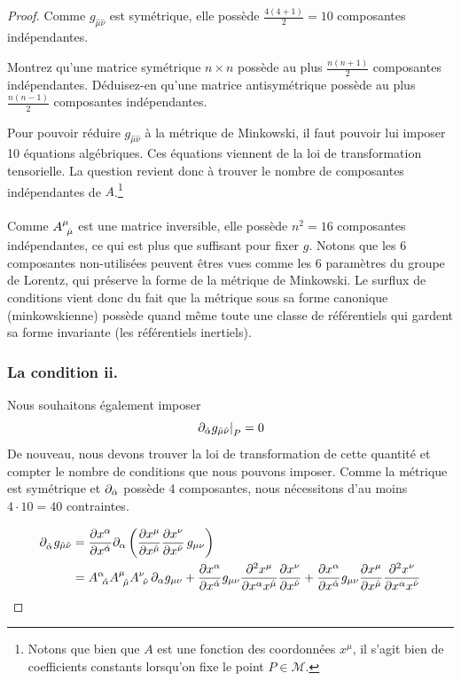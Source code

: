 \begin{proof}
Comme $g_{\hat{\mu}\hat{\nu}}$ est symétrique, elle possède $\frac{4 (4+1)}{2} = 10$ composantes indépendantes.
\begin{exerc}
    Montrez qu'une matrice symétrique $n \times n$ possède au plus $\frac{n(n+1)}{2}$ composantes indépendantes. Déduisez-en qu'une matrice antisymétrique possède au plus $\frac{n(n-1)}{2}$ composantes indépendantes.
\end{exerc}
Pour pouvoir réduire $g_{\hat{\mu}\hat{\nu}}$ à la métrique de Minkowski, il faut pouvoir lui imposer 10 équations algébriques. Ces équations viennent de la loi de transformation tensorielle. La question revient donc à trouver le nombre de composantes indépendantes de $A$.\footnote{Notons que bien que $A$ est une fonction des coordonnées $x^\mu$, il s'agit bien de coefficients constants lorsqu'on fixe le point $P\in \mathcal{M}$.}\\
\\
Comme $A\indices{^{\mu}_{\!\hat{\mu}}}$ est une matrice inversible, elle possède $n^2 = 16$ composantes indépendantes, ce qui est plus que suffisant pour fixer $g$. Notons que les 6 composantes non-utilisées peuvent êtres vues comme les 6 paramètres du groupe de Lorentz, qui préserve la forme de la métrique de Minkowski. Le surflux de conditions vient donc du fait que la métrique sous sa forme canonique (minkowskienne) possède quand même toute une classe de référentiels qui gardent sa forme invariante (les référentiels inertiels).
\subsubsection{La condition ii.}

Nous souhaitons également imposer
\begin{equation}
    \left. \partial_{\hat{\alpha}}g_{\hat{\mu}\hat{\nu}} \right|_P =0
\end{equation}
De nouveau, nous devons trouver la loi de transformation de cette quantité et compter le nombre de conditions que nous pouvons imposer. Comme la métrique est symétrique et $\partial_{\hat{\alpha}}$ possède 4 composantes, nous nécessitons d'au moins $4\cdot 10 = 40$ contraintes.

\begin{align}
\nonumber
   \partial\indices{_{\hat{\alpha}}}g_{\hat{\mu}\hat{\nu}} &= \frac{\partial x^{\alpha}}{\partial x^{\hat{\alpha}}}\partial_{\alpha}\lt \frac{\partial x^{\mu}}{\partial x^{\hat{\mu}}}\frac{\partial x^{\nu}}{\partial x^{\hat{\nu}}} \,g_{\mu \nu} \rt\\
   \label{preuve:PE1 ii.1}
   &= A\indices{^{\alpha}_{\!\hat{\alpha}}} A\indices{^{\mu}_{\!\hat{\mu}}} A\indices{^{\nu}_{\!\hat{\nu}}}\, \partial_{\alpha} g_{\mu \nu} + \frac{\partial x^{\alpha}}{\partial x^{\hat{\alpha}}} g_{\mu \nu}\frac{\partial^2 x^{\mu}}{\partial x^{\alpha}x^{\hat{\mu}}}\frac{\partial x^{\nu}}{\partial x^{\hat{\nu}}} + \frac{\partial x^{\alpha}}{\partial x^{\hat{\alpha}}} g_{\mu \nu}\frac{\partial x^{\mu}}{\partial x^{\hat{\mu}}}\frac{\partial^2 x^{\nu}}{\partial x^{\alpha}x^{\hat{\nu}}}
\end{align}


\end{proof}
